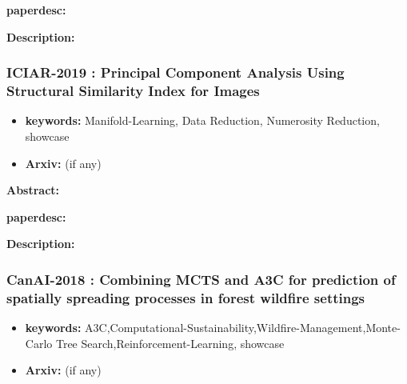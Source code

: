 \documentclass{article}
\begin{document}
\textbf{paperdesc:} 

\textbf{Description:} 



\newpage
\subsubsection{\textbf{ICIAR-2019} : Principal Component Analysis Using Structural Similarity Index for Images}
\begin{itemize}
\item \textbf{keywords:} Manifold-Learning, Data Reduction, Numerosity Reduction, showcase
\item \textbf{Arxiv:}  (if any)
\end{itemize}


\textbf{Abstract:} 

\textbf{paperdesc:} 

\textbf{Description:} 



\newpage
\subsubsection{\textbf{CanAI-2018} : Combining MCTS and A3C for prediction of spatially spreading processes in forest wildfire settings}
\begin{itemize}
\item \textbf{keywords:} A3C,Computational-Sustainability,Wildfire-Management,Monte-Carlo Tree Search,Reinforcement-Learning, showcase
\item \textbf{Arxiv:}  (if any)
\end{itemize}
\end{document}
